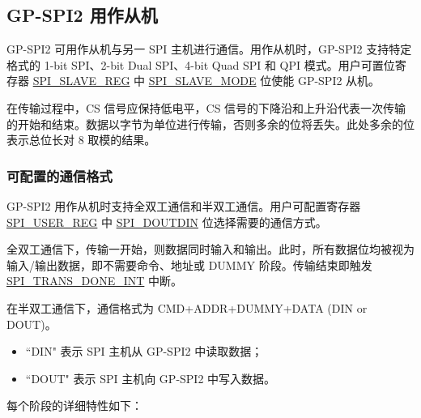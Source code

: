 \documentclass[main\_\_CN.tex]{subfiles}
\begin{document}
\subsection{GP-SPI2 用作从机}\label{sec:spi-slave-mode}

GP-SPI2 可用作从机与另一 SPI 主机进行通信。用作从机时，GP-SPI2 支持特定格式的 1-bit SPI、2-bit Dual SPI、4-bit Quad SPI 和 QPI 模式。用户可置位寄存器 \hyperref[regdesc:SPISLAVEREG]{SPI\_SLAVE\_REG} 中 \hyperref[fielddesc:SPISLAVEMODE]{SPI\_SLAVE\_MODE} 位使能 GP-SPI2 从机。

在传输过程中，CS 信号应保持低电平，CS 信号的下降沿和上升沿代表一次传输的开始和结束。数据以字节为单位进行传输，否则多余的位将丢失。此处多余的位表示总位长对 8 取模的结果。

\subsubsection{可配置的通信格式}\label{para:spi-slave-comm-format}

GP-SPI2 用作从机时支持全双工通信和半双工通信。用户可配置寄存器 \hyperref[regdesc:SPIUSERREG]{SPI\_USER\_REG} 中 \hyperref[fielddesc:SPIDOUTDIN]{SPI\_DOUTDIN} 位选择需要的通信方式。

全双工通信下，传输一开始，则数据同时输入和输出。此时，所有数据位均被视为输入/输出数据，即不需要命令、地址或 DUMMY 阶段。传输结束即触发 \hyperref[int:SPITRANSDONEINT]{SPI\_TRANS\_DONE\_INT} 中断。

在半双工通信下，通信格式为 CMD+ADDR+DUMMY+DATA (DIN or DOUT)。
\begin{itemize}
    \item ``DIN" 表示 SPI 主机从 GP-SPI2 中读取数据；
    \item ``DOUT" 表示 SPI 主机向 GP-SPI2 中写入数据。
\end{itemize}

每个阶段的详细特性如下：
\end{document}
